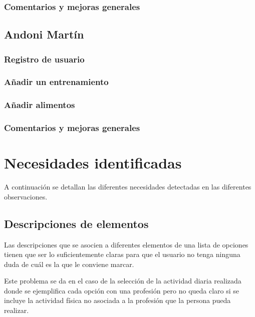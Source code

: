 \documentclass[a4paper]{article}
\begin{document}
			\subsubsection*{Comentarios y mejoras generales}
			
		\FloatBarrier
		
		\subsection{Andoni Martín}
		
			\subsubsection*{Registro de usuario}
			
			\subsubsection*{Añadir un entrenamiento}
			
			\subsubsection*{Añadir alimentos}
			
			\subsubsection*{Comentarios y mejoras generales}
			
		\FloatBarrier
		

\section{Necesidades identificadas}

A continuación se detallan las diferentes necesidades detectadas en las diferentes observaciones.

	\subsection{Descripciones de elementos}
	
	Las descripciones que se asocien a diferentes elementos de una lista de opciones tienen que ser lo suficientemente claras para que el usuario no tenga ninguna duda de cuál es la que le conviene marcar.
	
	Este problema se da en el caso de la selección de la actividad diaria realizada donde se ejemplifica cada opción con una profesión pero no queda claro si se incluye la actividad física no asociada a la profesión que la persona pueda realizar.
	
\end{document}
